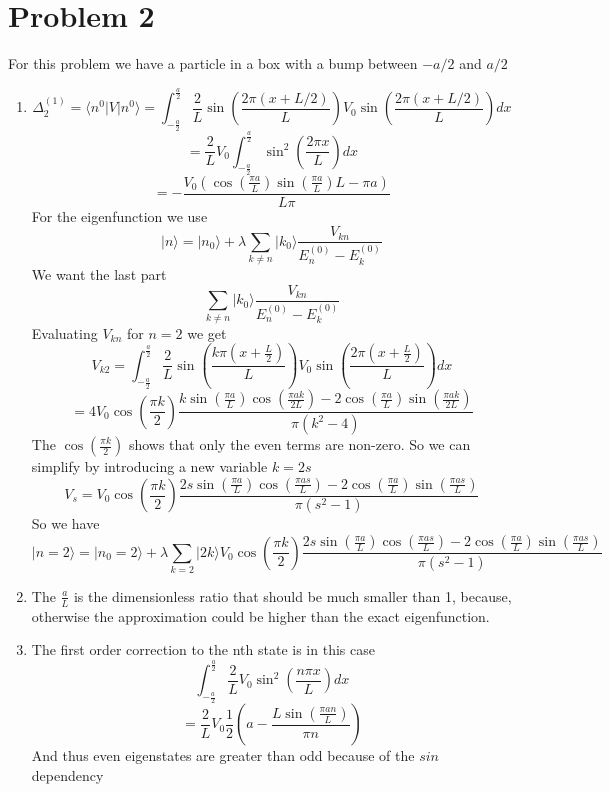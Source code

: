\documentclass[12pt]{article}
\newcommand{\ket}[1]{\vert{#1}\rangle}
\begin{document}
\section*{Problem 2} 
For this problem we have a particle in a box with a bump between $-a/2$ and $a/2$
\begin{enumerate}
    \item $$ \Delta_2^{(1)} = \langle n^0 | V | n^0 \rangle = \int_{- \frac{a}{2}}^{\frac{a}{2}} \frac{2}{L} \sin ( \frac{2 \pi ( x + L/2) }{L} ) V_0 \sin ( \frac{2 \pi ( x + L/2) }{L} ) dx $$
    $$ = \frac{2}{L} V_0 \int_{- \frac{a}{2}}^{\frac{a}{2}} \sin^2 ( \frac{ 2 \pi x}{L} ) dx $$
    $$ = - \frac{V_0 ( \cos( \frac{\pi a}{L} ) \sin ( \frac{ \pi a}{L} ) L - \pi a ) }{L \pi} $$
    For the eigenfunction we use 
    $$ \ket{n} = \ket{n_0} + \lambda \sum_{k \neq n} \ket{k_0} \frac{ V_{kn} }{E_n^{(0)} - E_k^{(0)}}$$ 
    We want the last part 
    $$ \sum_{k \neq n} \ket{k_0} \frac{ V_{kn} }{E_n^{(0)} - E_k^{(0)}}$$ 
    Evaluating $V_{kn}$ for $n=2$ we get 
    $$ V_{k2} =  \int_{- \frac{a}{2}}^{\frac{a}{2}} \frac{2}{L} \sin(\frac{k \pi(x + \frac{L}{2})}{L} ) V_0 \sin( \frac{2 \pi (x + \frac{L}{2} ) }{L} ) dx $$
    $$ = 4 V_0 \cos (\frac{ \pi k}{2} ) \frac{k \sin (\frac{\pi a}{L} ) \cos(\frac{\pi a k}{2L} ) - 2 \cos (\frac{\pi a}{L} ) \sin(\frac{\pi a k }{2L} )}{\pi (k^2 -4)} $$
    The $\cos (\frac{ \pi k}{2} )$ shows that only the even terms are non-zero. So we can simplify by introducing a new variable $k=2s$ 
    $$ V_{s} = V_0 \cos (\frac{ \pi k}{2} )  \frac{2s \sin (\frac{\pi a}{L} ) \cos(\frac{\pi a s}{L} ) - 2 \cos (\frac{\pi a}{L} ) \sin(\frac{\pi a s }{L} )}{\pi (s^2 -1)} $$
    So we have 
    $$ \ket{n=2} = \ket{n_0 =2} + \lambda \sum_{k=2} \ket{2k} V_0 \cos (\frac{ \pi k}{2} )  \frac{2s \sin (\frac{\pi a}{L} ) \cos(\frac{\pi a s}{L} ) - 2 \cos (\frac{\pi a}{L} ) \sin(\frac{\pi a s }{L} )}{\pi (s^2 -1)} $$


    \item The $\frac{a}{L}$ is the dimensionless ratio that should be much smaller than 1, because, otherwise the approximation could be higher than the exact eigenfunction. 
    
    \item The first order correction to the nth state is in this case 
    $$ \int_{- \frac{a}{2}}^{\frac{a}{2}} \frac{2}{L} V_0 \sin^2 (\frac{n \pi x}{L} ) dx $$
    $$ = \frac{2}{L} V_0 \frac{1}{2} ( a - \frac{L \sin ( \frac{\pi a n }{L} ) }{\pi n} ) $$ 
    And thus even eigenstates are greater than odd because of the $sin$ dependency
\end{enumerate}
\end{document}
